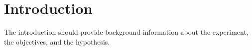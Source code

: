 \section{Introduction}
The introduction should provide background information about the experiment, the objectives, and the hypothesis.
